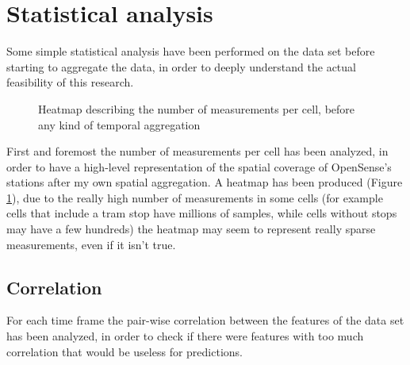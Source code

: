 \documentclass[11pt,a4paper,titlepage]{book}
\begin{document}
\section{Statistical analysis}
Some simple statistical analysis have been performed on the data set before starting to aggregate the data, in order to deeply understand the actual feasibility of this research.
\begin{figure}[ht]
    \centering
    
    \caption{Heatmap describing the number of measurements per cell, before any kind of temporal aggregation} 
    \label{count_heatmap}
\end{figure}
\newline
\newline
First and foremost the number of measurements per cell has been analyzed, in order to have a high-level representation of the spatial coverage of OpenSense's stations after my own spatial aggregation. A heatmap has been produced (Figure \ref{count_heatmap}), due to the really high number of measurements in some cells (for example cells that include a tram stop have millions of samples, while cells without stops may have a few hundreds) the heatmap may seem to represent really sparse measurements, even if it isn't true.
\newline
\newline
\subsection{Correlation}
For each time frame the pair-wise correlation between the features of the data set has been analyzed, in order to check if there were features with too much correlation that would be useless for predictions.
\end{document}
